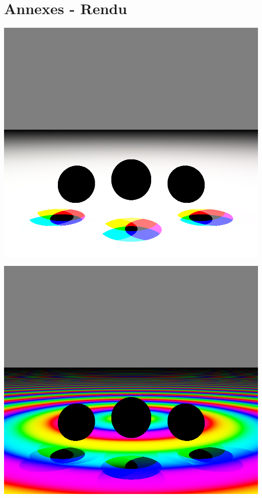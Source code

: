 \documentclass{article}
\begin{document}
\section{Annexes - Rendu}
\begin{center}
\includegraphics[scale=0.3]{demo-1-1.png}

\includegraphics[scale=0.3]{demo-1-2.png}


\end{center}
\end{document}
